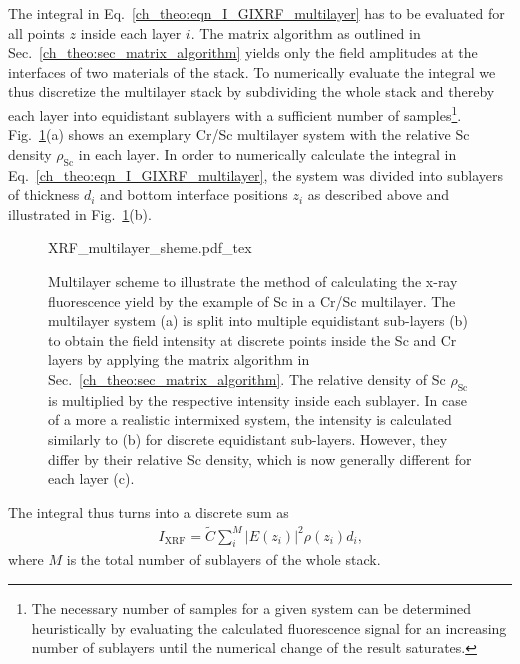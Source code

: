 The integral in Eq.~\eqref{ch_theo:eqn_I_GIXRF_multilayer} has to be evaluated for all points $z$ inside each layer $i$. The matrix algorithm as outlined in Sec.~\ref{ch_theo:sec_matrix_algorithm} yields only the field amplitudes at the interfaces of two materials of the stack. To numerically evaluate the integral we thus discretize the multilayer stack by subdividing the whole stack and thereby each layer into equidistant sublayers with a sufficient number of samples\footnote{The necessary number of samples for a given system can be determined heuristically by evaluating the calculated fluorescence signal for an increasing number of sublayers until the numerical change of the result saturates.}. Fig.~\ref{ch_theo:fig_xrf_multilayer_scheme}(a) shows an exemplary Cr/Sc multilayer system with the relative Sc density $\rho_\text{Sc}$ in each layer. In order to numerically calculate the integral in Eq.~\eqref{ch_theo:eqn_I_GIXRF_multilayer}, the system was divided into sublayers of thickness $d_i$ and bottom interface positions $z_i$ as described above and illustrated in Fig.~\ref{ch_theo:fig_xrf_multilayer_scheme}(b).
\begin{figure}[htb]
    \def\svgwidth{\textwidth}
    {XRF_multilayer_sheme.pdf_tex}
    \caption[Calculation scheme for the x-ray fluorescence]{Multilayer scheme to illustrate the method of calculating the x-ray fluorescence yield by the example of Sc in a Cr/Sc multilayer. The multilayer system (a) is split into multiple equidistant sub-layers (b) to obtain the field intensity at discrete points inside the Sc and Cr layers by applying the matrix algorithm in Sec.~\ref{ch_theo:sec_matrix_algorithm}. The relative density of Sc $\rho_\text{Sc}$ is multiplied by the respective intensity inside each sublayer. In case of a more a realistic intermixed system, the intensity is calculated similarly to (b) for discrete equidistant sub-layers. However, they differ by their relative Sc density, which is now generally different for each layer (c).}
    \label{ch_theo:fig_xrf_multilayer_scheme}
\end{figure}
The integral thus turns into a discrete sum as
\begin{align}
I_\text{XRF} = \tilde{C} \sum \limits_i^{M} | E(z_i) |^2 \rho(z_i) d_i \text{,} \label{ch_theo:eqn_I_GIXRF_multilayer_discrete}
\end{align}
where $M$ is the total number of sublayers of the whole stack.

